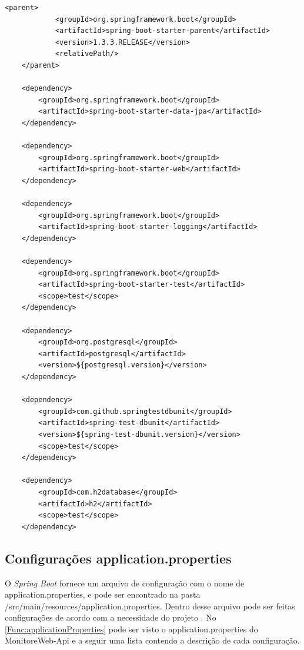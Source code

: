 \begin{lstlisting}[style=XML,label=Func:POMMonitorWebApi,caption={[Arquivo POM com as principais dependências do projeto.]Arquivo POM com as principais dependências do projeto.}]
	<parent>
			<groupId>org.springframework.boot</groupId>
			<artifactId>spring-boot-starter-parent</artifactId>
			<version>1.3.3.RELEASE</version>
			<relativePath/>
	</parent>
	
	<dependency>
		<groupId>org.springframework.boot</groupId>
		<artifactId>spring-boot-starter-data-jpa</artifactId>
	</dependency>
	
	<dependency>
		<groupId>org.springframework.boot</groupId>
		<artifactId>spring-boot-starter-web</artifactId>
	</dependency>

	<dependency>
		<groupId>org.springframework.boot</groupId>
		<artifactId>spring-boot-starter-logging</artifactId>
	</dependency>

	<dependency>
		<groupId>org.springframework.boot</groupId>
		<artifactId>spring-boot-starter-test</artifactId>
		<scope>test</scope>
	</dependency>
				
	<dependency>
		<groupId>org.postgresql</groupId>
		<artifactId>postgresql</artifactId>
		<version>${postgresql.version}</version>
	</dependency>

	<dependency>
		<groupId>com.github.springtestdbunit</groupId>
		<artifactId>spring-test-dbunit</artifactId>
		<version>${spring-test-dbunit.version}</version>
		<scope>test</scope>
	</dependency>

	<dependency>
		<groupId>com.h2database</groupId>
		<artifactId>h2</artifactId>
		<scope>test</scope>
	</dependency>
\end{lstlisting}



\subsection{Configurações application.properties}\label{subsec:ConfiguraçõesApplicationProperties}

O \textit{Spring Boot} fornece um arquivo de configuração com o nome de application.properties, e pode ser encontrado na pasta /src/main/resources/application.properties. Dentro desse arquivo pode ser feitas configurações de acordo com a necessidade do projeto \cite{springBoot:2017}. No \autoref{Func:applicationProperties} pode ser visto o application.properties do MonitoreWeb-Api e a seguir uma lista contendo a descrição de cada configuração.

